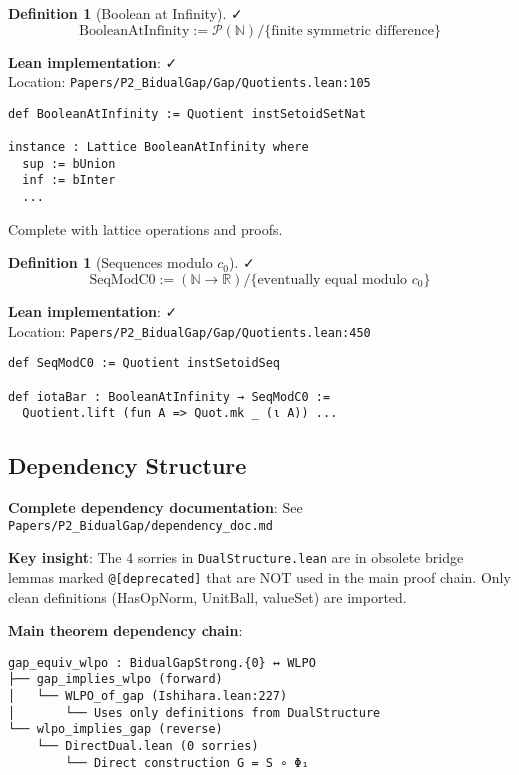 \documentclass[11pt]{article}
\theoremstyle{definition}
\newtheorem{definition}[theorem]{Definition}
\theoremstyle{remark}
\newcommand{\leanok}{\textcolor{green!70!black}{✓}}
\newcommand{\leanloc}[1]{\texttt{\footnotesize\color{blue!60!black}#1}}
\newcommand{\N}{\mathbb{N}}
\newcommand{\R}{\mathbb{R}}
\begin{document}
\begin{definition}[Boolean at Infinity]\label{def:bool-inf} \leanok
\[
\text{BooleanAtInfinity} := \mathcal{P}(\N) / \{\text{finite symmetric difference}\}
\]
\end{definition}

\begin{mdframed}[style=okbox]
\textbf{Lean implementation}: \leanok\\
Location: \leanloc{Papers/P2\_BidualGap/Gap/Quotients.lean:105}\\
\begin{verbatim}
def BooleanAtInfinity := Quotient instSetoidSetNat

instance : Lattice BooleanAtInfinity where
  sup := bUnion
  inf := bInter
  ...
\end{verbatim}
Complete with lattice operations and proofs.
\end{mdframed}

\begin{definition}[Sequences modulo \(c_0\)]\label{def:seq-mod-c0} \leanok
\[
\text{SeqModC0} := (\N \to \R) / \{\text{eventually equal modulo } c_0\}
\]
\end{definition}

\begin{mdframed}[style=okbox]
\textbf{Lean implementation}: \leanok\\
Location: \leanloc{Papers/P2\_BidualGap/Gap/Quotients.lean:450}\\
\begin{verbatim}
def SeqModC0 := Quotient instSetoidSeq

def iotaBar : BooleanAtInfinity → SeqModC0 :=
  Quotient.lift (fun A => Quot.mk _ (ι A)) ...
\end{verbatim}
\end{mdframed}

\subsection{Dependency Structure}

\begin{mdframed}[style=leanbox]
\textbf{Complete dependency documentation}: See \leanloc{Papers/P2\_BidualGap/dependency\_doc.md}

\textbf{Key insight}: The 4 sorries in \texttt{DualStructure.lean} are in obsolete bridge lemmas marked \texttt{@[deprecated]} that are NOT used in the main proof chain. Only clean definitions (HasOpNorm, UnitBall, valueSet) are imported.

\textbf{Main theorem dependency chain}:
\begin{verbatim}
gap_equiv_wlpo : BidualGapStrong.{0} ↔ WLPO
├── gap_implies_wlpo (forward)
│   └── WLPO_of_gap (Ishihara.lean:227)
│       └── Uses only definitions from DualStructure
└── wlpo_implies_gap (reverse)
    └── DirectDual.lean (0 sorries)
        └── Direct construction G = S ∘ Φ₁
\end{verbatim}
\end{mdframed}
\end{document}
